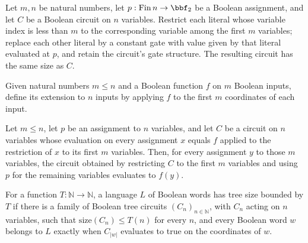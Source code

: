 \begin{theorem}
\label{BoolCircuit.restrictCircuit_size}
\leanok
{}
Let $m,n$ be natural numbers, let $p : \mathrm{Fin}\,n \to \bbf_2$ be a Boolean
assignment, and let $C$ be a Boolean circuit on $n$ variables. Restrict each literal
whose variable index is less than $m$ to the corresponding variable among the first $m$
variables; replace each other literal by a constant gate with value given by that
literal evaluated at $p$, and retain the circuit's gate structure. The resulting circuit
has the same size as $C$.
\end{theorem}

\begin{definition}
\label{BoolCircuit.onFirst}
\leanok
Given natural numbers $m \le n$ and a Boolean function $f$ on $m$ Boolean inputs, define
its extension to $n$ inputs by applying $f$ to the first $m$ coordinates of each input.
\end{definition}

\begin{theorem}
\label{BoolCircuit.restrictCircuit_eval_of_onFirst}
\leanok
{}
Let $m\le n$, let $p$ be an assignment to $n$ variables, and let $C$ be a circuit on
$n$ variables whose evaluation on every assignment $x$ equals $f$ applied to the
restriction of $x$ to its first $m$ variables. Then, for every assignment $y$ to those
$m$ variables, the circuit obtained by restricting $C$ to the first $m$ variables and
using $p$ for the remaining variables evaluates to $f(y)$.
\end{theorem}

\begin{definition}
\label{Language.InTreeSize}
\leanok
{}
For a function $T:\mathbb{N}\to\mathbb{N}$, a language $L$ of Boolean words has tree
size bounded by $T$ if there is a family of Boolean tree circuits
$(C_n)_{n\in\mathbb{N}}$, with $C_n$ acting on $n$ variables, such that
$\mathrm{size}(C_n)\le T(n)$ for every $n$, and every Boolean word $w$ belongs to $L$
exactly when $C_{|w|}$ evaluates to true on the coordinates of $w$.
\end{definition}

